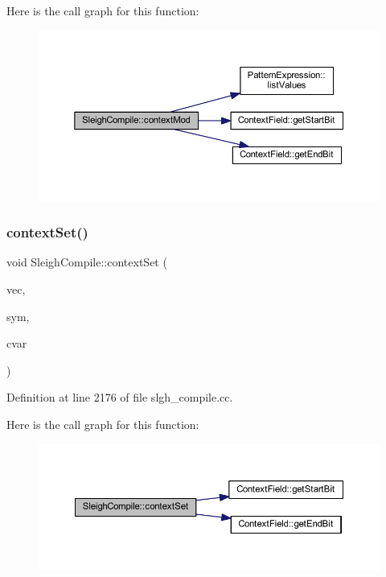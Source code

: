 Here is the call graph for this function\+:
\nopagebreak
\begin{figure}[H]
\begin{center}
\leavevmode
\includegraphics[width=350pt]{class_sleigh_compile_a84c46e7d0a62a9fbdb300e9b2df3f303_cgraph}
\end{center}
\end{figure}
\mbox{\label{class_sleigh_compile_ac7162d3b41a8315268b9a0d44d82d049}} 
\subsubsection{\texorpdfstring{contextSet()}{contextSet()}}
{\footnotesize\ttfamily void Sleigh\+Compile\+::context\+Set (\begin{DoxyParamCaption}\item[{vector$<$ \mbox{\hyperlink{class_context_change}{Context\+Change}} $\ast$ $>$ $\ast$}]{vec,  }\item[{\mbox{\hyperlink{class_triple_symbol}{Triple\+Symbol}} $\ast$}]{sym,  }\item[{\mbox{\hyperlink{class_context_symbol}{Context\+Symbol}} $\ast$}]{cvar }\end{DoxyParamCaption})}



Definition at line 2176 of file slgh\+\_\+compile.\+cc.

Here is the call graph for this function\+:
\nopagebreak
\begin{figure}[H]
\begin{center}
\leavevmode
\includegraphics[width=350pt]{class_sleigh_compile_ac7162d3b41a8315268b9a0d44d82d049_cgraph}
\end{center}
\end{figure}
\mbox{\label{class_sleigh_compile_ac31ebb2619890f9c574cd2c18d198995}} 
